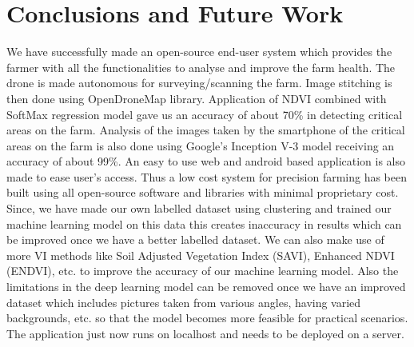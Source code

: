 \chapter{Conclusions and Future Work}

We have successfully made an open-source end-user system which provides the farmer with all the functionalities to analyse and improve the farm health. The drone is made autonomous for surveying/scanning the farm. Image stitching is then done using OpenDroneMap library. Application of NDVI combined with SoftMax regression model gave us an accuracy of about 70\% in detecting critical areas on the farm. Analysis of the images taken by the smartphone of the critical areas on the farm is also done using Google’s Inception V-3 model receiving an accuracy of about 99\%. An easy to use web and android based application is also made to ease user’s access. Thus a low cost system for precision farming has been built using all open-source software and libraries with minimal proprietary cost. Since, we have made our own labelled dataset using clustering and trained our machine learning model on this data this creates inaccuracy in results which can be improved once we have a better labelled dataset. We can also make use of more VI methods like Soil Adjusted Vegetation Index (SAVI), Enhanced NDVI (ENDVI), etc. to improve the accuracy of our machine learning model. Also the limitations in the deep learning model can be removed once we have an improved dataset which includes pictures taken from various angles, having varied backgrounds, etc. so that the model becomes more feasible for practical scenarios. The application just now runs on localhost and needs to be deployed on a server.  